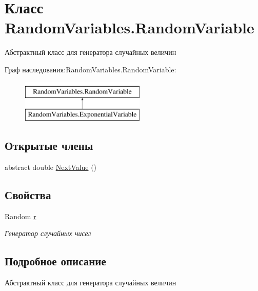 \hypertarget{class_random_variables_1_1_random_variable}{}\section{Класс Random\+Variables.\+Random\+Variable}
\label{class_random_variables_1_1_random_variable}


Абстрактный класс для генератора случайных величин  


Граф наследования\+:Random\+Variables.\+Random\+Variable\+:\begin{figure}[H]
\begin{center}
\leavevmode
\includegraphics[height=2.000000cm]{class_random_variables_1_1_random_variable}
\end{center}
\end{figure}
\subsection*{Открытые члены}
\begin{DoxyCompactItemize}
\item 
abstract double \hyperlink{class_random_variables_1_1_random_variable_adf5ef829531ebcc4f0591b81d579519a}{Next\+Value} ()
\end{DoxyCompactItemize}
\subsection*{Свойства}
\begin{DoxyCompactItemize}
\item 
Random \hyperlink{class_random_variables_1_1_random_variable_a8a79eb7a1676b85b74906831b2850cb9}{r}
\begin{DoxyCompactList}\small\item\em Генератор случайных чисел \end{DoxyCompactList}\end{DoxyCompactItemize}


\subsection{Подробное описание}
Абстрактный класс для генератора случайных величин 



